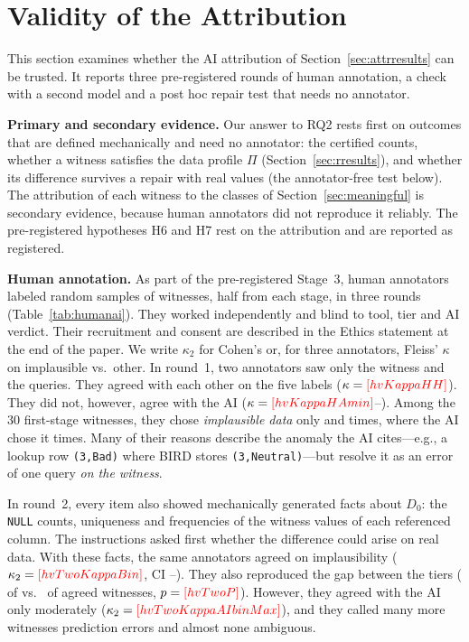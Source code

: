 \section{Validity of the Attribution}\label{sec:validity}

This section examines whether the AI attribution of Section~\ref{sec:attrresults} can be trusted. It reports three pre-registered rounds of human annotation, a check with a second model and a post hoc repair test that needs no annotator.



\textbf{Primary and secondary evidence.} Our answer to RQ2 rests first on outcomes that are defined mechanically and need no annotator: the certified counts, whether a witness satisfies the data profile $\Pi$ (Section~\ref{sec:rresults}), and whether its difference survives a repair with real values (the annotator-free test below). The attribution of each witness to the classes of Section~\ref{sec:meaningful} is secondary evidence, because human annotators did not reproduce it reliably. The pre-registered hypotheses H6 and H7 rest on the attribution and are reported as registered.

\textbf{Human annotation.} As part of the pre-registered Stage~3, human annotators labeled random samples of witnesses, half from each stage, in three rounds (Table~\ref{tab:humanai}). They worked independently and blind to tool, tier and AI verdict. Their recruitment and consent are described in the Ethics statement at the end of the paper. We write $\kappa_2$ for Cohen's or, for three annotators, Fleiss' $\kappa$ on implausible vs.\ other. In round~1, two annotators saw only the witness and the queries. They agreed with each other on the five labels ($\kappa=\V{hvKappaHH}$). They did not, however, agree with the AI ($\kappa=\V{hvKappaHAmin}$--). Among the 30 first-stage witnesses, they chose \emph{implausible data} only  and  times, where the AI chose it  times. Many of their reasons describe the anomaly the AI cites---e.g., a lookup row \texttt{(3,\textquotesingle{}Bad\textquotesingle{})} where BIRD stores \texttt{(3,\textquotesingle{}Neutral\textquotesingle{})}---but resolve it as an error of one query \emph{on the witness}.

In round~2, every item also showed mechanically generated facts about $D_0$: the \texttt{NULL} counts, uniqueness and frequencies of the witness values of each referenced column. The instructions asked first whether the difference could arise on real data. With these facts, the same annotators agreed on implausibility ($\kappa_2=\V{hvTwoKappaBin}$, CI --). They also reproduced the gap between the tiers ( of  vs.\  of  agreed witnesses, $p=\V{hvTwoP}$). However, they agreed with the AI only moderately ($\kappa_2=\V{hvTwoKappaAIbinMax}$), and they called many more witnesses prediction errors and almost none ambiguous.

